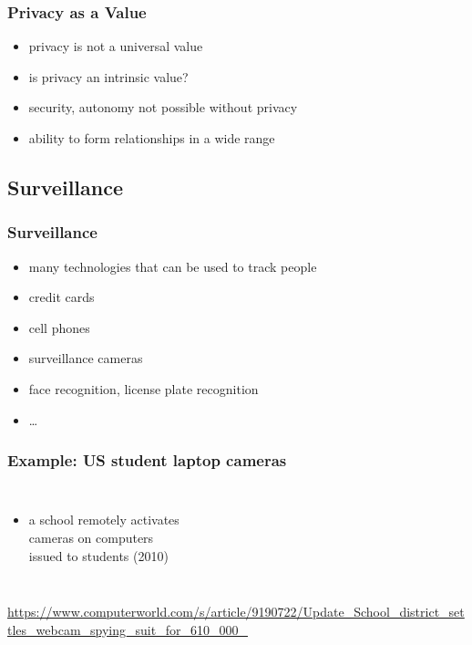\documentclass[dvipsnames]{beamer}
\theoremstyle{definition}
\theoremstyle{example}
\theoremstyle{plain}
\begin{document}
\begin{frame}
  \frametitle{Privacy as a Value}

  \begin{itemize}
    \item privacy is not a universal value

    \pause
    \bigskip
    \item is privacy an intrinsic value?
    \smallskip
    \item security, autonomy not possible without privacy
    \item ability to form relationships in a wide range
  \end{itemize}
\end{frame}

\subsection{Surveillance}

\begin{frame}
  \frametitle{Surveillance}

  \begin{itemize}
    \item many technologies that can be used to track people

    \medskip
    \item credit cards
    \item cell phones
    \item surveillance cameras
    \item face recognition, license plate recognition
    \item \ldots
  \end{itemize}
\end{frame}

\begin{frame}
  \frametitle{Example: US student laptop cameras}

  \begin{columns}

    \begin{itemize}
      \item a school remotely activates\\
        cameras on computers\\
        issued to students (2010)
    \end{itemize}
  \end{columns}

  \medskip
  \tiny{\url{https://www.computerworld.com/s/article/9190722/Update_School_district_settles_webcam_spying_suit_for_610_000_}}\\
\end{frame}
\end{document}
